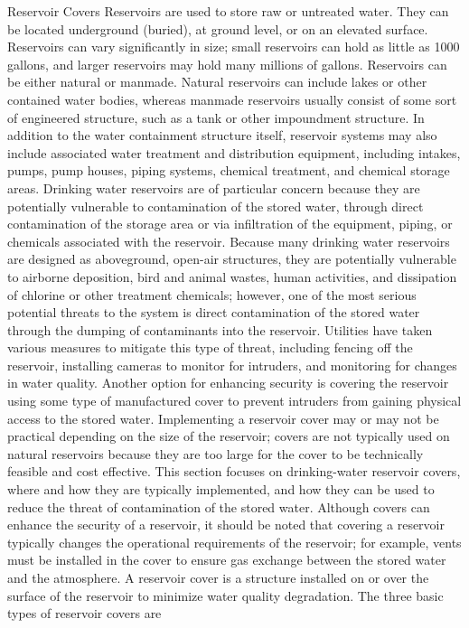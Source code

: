 \documentclass{article}
\begin{document}
Reservoir Covers Reservoirs are used to store raw or untreated water.
They can be located underground (buried), at ground level, or on an
elevated surface. Reservoirs can vary significantly in size; small
reservoirs can hold as little as 1000 gallons, and larger reservoirs may
hold many millions of gallons. Reservoirs can be either natural or
manmade. Natural reservoirs can include lakes or other contained water
bodies, whereas manmade reservoirs usually consist of some sort of
engineered structure, such as a tank or other impoundment structure. In
addition to the water containment structure itself, reservoir systems
may also include associated water treatment and distribution equipment,
including intakes, pumps, pump houses, piping systems, chemical
treatment, and chemical storage areas. Drinking water reservoirs are of
particular concern because they are potentially vulnerable to
contamination of the stored water, through direct contamination of the
storage area or via infiltration of the equipment, piping, or chemicals
associated with the reservoir. Because many drinking water reservoirs
are designed as aboveground, open-air structures, they are potentially
vulnerable to airborne deposition, bird and animal wastes, human
activities, and dissipation of chlorine or other treatment chemicals;
however, one of the most serious potential threats to the system is
direct contamination of the stored water through the dumping of
contaminants into the reservoir. Utilities have taken various measures
to mitigate this type of threat, including fencing off the reservoir,
installing cameras to monitor for intruders, and monitoring for changes
in water quality. Another option for enhancing security is covering the
reservoir using some type of manufactured cover to prevent intruders
from gaining physical access to the stored water. Implementing a
reservoir cover may or may not be practical depending on the size of the
reservoir; covers are not typically used on natural reservoirs because
they are too large for the cover to be technically feasible and cost
effective. This section focuses on drinking-water reservoir covers,
where and how they are typically implemented, and how they can be used
to reduce the threat of contamination of the stored water. Although
covers can enhance the security of a reservoir, it should be noted that
covering a reservoir typically changes the operational requirements of
the reservoir; for example, vents must be installed in the cover to
ensure gas exchange between the stored water and the atmosphere. A
reservoir cover is a structure installed on or over the surface of the
reservoir to minimize water quality degradation. The three basic types
of reservoir covers are
\end{document}
